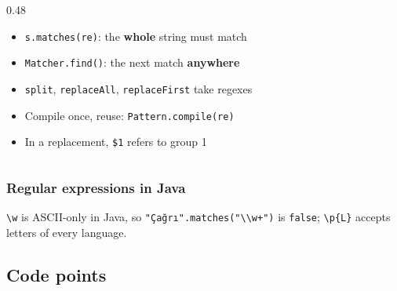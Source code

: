 \documentclass[aspectratio=169,10pt,compress]{beamer}
\begin{document}
\begin{frame}[t,fragile]
\begin{columns}[T]
\begin{column}{0.48\textwidth}
\begin{itemize}
        \item \texttt{s.matches(re)}: the \textbf{whole} string must match
        \item \texttt{Matcher.find()}: the next match \textbf{anywhere}
        \item \texttt{split}, \texttt{replaceAll}, \texttt{replaceFirst} take regexes
        \item Compile once, reuse: \texttt{Pattern.compile(re)}
        \item In a replacement, \texttt{\$1} refers to group 1
      \end{itemize}
    \end{column}
  \end{columns}
\end{frame}




\begin{frame}[t,fragile] \frametitle{Regular expressions in Java}

  \vspace{0.2em}
  \small \texttt{\textbackslash w} is ASCII-only in Java, so \texttt{"Çağrı".matches("\textbackslash\textbackslash w+")} is \texttt{false};
  \texttt{\textbackslash p\{L\}} accepts letters of every language.
\end{frame}


\subsection[Code points]{Code points}
\end{document}
